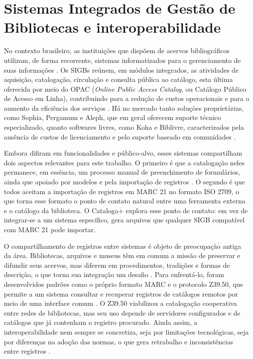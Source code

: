 \section{Sistemas Integrados de Gestão de Bibliotecas e interoperabilidade}
\label{sec:sigb}

No contexto brasileiro, as instituições que dispõem de acervos bibliográficos utilizam, de forma recorrente, sistemas informatizados para o gerenciamento de suas informações \cite{corte2002}. Os SIGBs reúnem, em módulos integrados, as atividades de aquisição, catalogação, circulação e consulta pública ao catálogo, esta última oferecida por meio do OPAC (\textit{Online Public Access Catalog}, ou Catálogo Público de Acesso em Linha), contribuindo para a redução de custos operacionais e para o aumento da eficiência dos serviços \cite{lancaster2004}. Há no mercado tanto soluções proprietárias, como Sophia, Pergamum e Aleph, que em geral oferecem suporte técnico especializado, quanto softwares livres, como Koha e Biblivre, caracterizados pela ausência de custos de licenciamento e pelo suporte baseado em comunidades \cite{breeding2015,tammaro2008}.

Embora difiram em funcionalidades e público-alvo, esses sistemas compartilham dois aspectos relevantes para este trabalho. O primeiro é que a catalogação neles permanece, em essência, um processo manual de preenchimento de formulários, ainda que apoiado por modelos e pela importação de registros \cite{mey2009}. O segundo é que todos aceitam a importação de registros em MARC 21 no formato ISO 2709, o que torna esse formato o ponto de contato natural entre uma ferramenta externa e o catálogo da biblioteca. O Cataloga+ explora esse ponto de contato: em vez de integrar-se a um sistema específico, gera arquivos que qualquer SIGB compatível com MARC 21 pode importar.

O compartilhamento de registros entre sistemas é objeto de preocupação antiga da área. Bibliotecas, arquivos e museus têm em comum a missão de preservar e difundir seus acervos, mas diferem em procedimentos, tradições e formas de descrição, o que torna sua integração um desafio \cite{marcondes2016}. Para enfrentá-lo, foram desenvolvidos padrões como o próprio formato MARC e o protocolo Z39.50, que permite a um sistema consultar e recuperar registros de catálogos remotos por meio de uma interface comum \cite{moen1998,rosetto1997}. O Z39.50 viabilizou a catalogação cooperativa entre redes de bibliotecas, mas seu uso depende de servidores configurados e de catálogos que já contenham o registro procurado. Ainda assim, a interoperabilidade nem sempre se concretiza, seja por limitações tecnológicas, seja por diferenças na adoção das normas, o que gera retrabalho e inconsistências entre registros \cite{ifla2009}.

